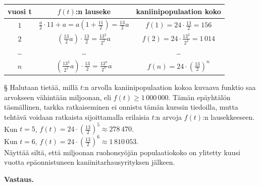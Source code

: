 \begin{esimerkki}
{\begin{tabular}{|c|c|c|}                                                     \hline
\textbf{vuosi t} & \textbf{$f(t)$:n lauseke} & \textbf{kaniinipopulaation koko}\\ \hline
$1$ &   $\frac{a}{2}\cdot11 + a = a(1+\frac{11}{2}) = \frac{13}{2}a$ & $f(1)=24\cdot\frac{13}{2}= 156$ \\ \hline 
$2$ &   $\left(\frac{13}{2}a\right)\cdot\frac{13}{2}= \frac{13^2}{2^2}a$  & $f(2)=24\cdot\frac{13^2}{2^2}= 1\,014$\\ \hline 
\ldots  & 		\ldots	&	\ldots	 \\ \hline
$n$ &   $\left(\frac{13^2}{2^2}a\right)\cdot\frac{13}{2} = \frac{13^n}{2^n}a$   & $f(n)=24\cdot\left(\frac{13}{2}\right)^n$\\ \hline 
    \end{tabular}
 
§ Halutaan tietää, millä $t$:n arvolla kaniinipopulaation kokoa kuvaava funktio saa arvokseen vähintään miljoonan, eli $f(t)\geq1\,000\,000$. Tämän epäyhtälön täsmällinen, tarkka ratkaiseminen ei onnistu tämän kurssin tiedoilla, mutta tehtävä voidaan ratkaista sijoittamalla erilaisia $t$:n arvoja $f(t)$:n lausekkeeseen.\\
Kun $t=5$, $f(t)=24\cdot\left(\frac{13}{2}\right)^5 \approx 278\,470$. \\
Kun $t=6$, $f(t)=24\cdot\left(\frac{13}{2}\right)^6 \approx 1\,810\,053$. \\

Näyttää siltä, että miljoonan ruohonsyöjän populaatiokoko on ylitetty kuusi vuotta epäonnistuneen kaniinitarhausyrityksen jälkeen.
}

\textbf{Vastaus.}

\end{esimerkki}
